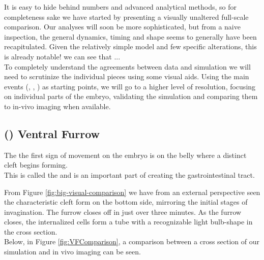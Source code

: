 It is easy to hide behind numbers and advanced analytical methods, so for completeness sake we have started by presenting a visually unaltered full-scale comparison. Our analyses will soon be more sophisticated, but from a naive inspection, the general dynamics, timing and shape seems to generally have been recapitulated. Given the relatively simple model and few specific alterations, this is already notable! we can see that ... \\ 


To completely understand the agreements between data and simulation we will need to scrutinize the individual pieces using some visual aids. Using the main events (, , ) as starting points, we will go to a higher level of resolution, focusing on individual parts of the embryo, validating the simulation and comparing them to in-vivo imaging when available.


\subsection{() Ventral Furrow }
The the first sign of movement on the embryo is on the belly where a distinct cleft begins forming. \\
This is called the  and is an important part of creating the gastrointestinal tract.

From Figure \ref{fig:big-visual-comparison} we have from an external perspective seen the characteristic cleft form on the bottom side, mirroring the initial stages of invagination. The furrow closes off in just over three minutes.\cite{holly2015rapid}
As the furrow closes, the internalized cells form a tube with a recognizable light bulb-shape in the cross section. \\

Below, in Figure \ref{fig:VFComparison}, a comparison between a cross section of our simulation and in vivo imaging can be seen.

